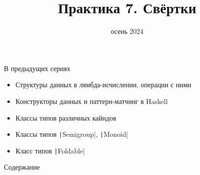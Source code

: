 
\newif\ifhandout




\title[7. Свёртки]{Практика 7. Свёртки}
\date{осень 2024}



    \setcounter{framenumber}{-1}
    \maketitle

    \begin{frame}[fragile]{В предыдущих сериях}
        \begin{itemize}
            \item Структуры данных в лямбда-исчислении, операции с ними
            \item Конструкторы данных и паттерн-матчинг в Haskell
            \item Классы типов различных кайндов
            \item[\newtopic] Классы типов \texttt|Semigroup|, \texttt|Monoid|
            \item[\newtopic] Класс типов \texttt|Foldable|
        \end{itemize}
    \end{frame}

    \begin{frame}[noframenumbering]{Содержание}
        \tableofcontents
    \end{frame}


